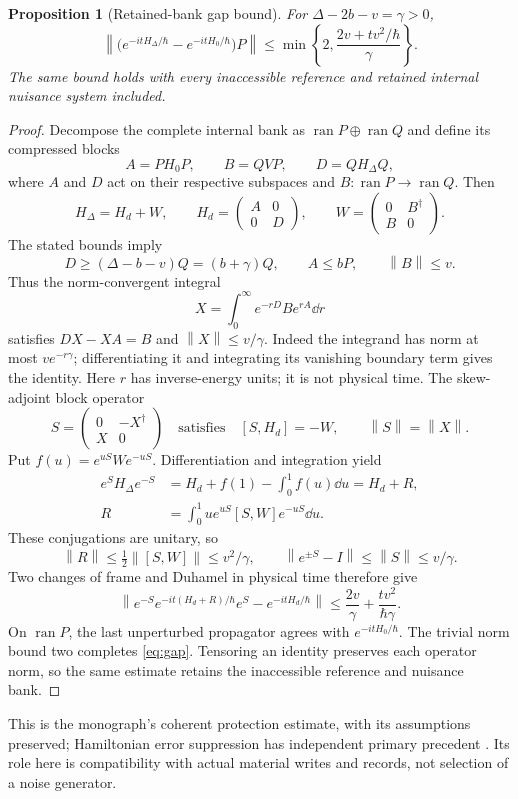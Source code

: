 \documentclass[11pt]{article}
\newtheorem{proposition}[theorem]{Proposition}
\theoremstyle{definition}\newtheorem{assumption}[theorem]{Constitutive assumption}
\theoremstyle{remark}\newtheorem{remark}[theorem]{Remark}
\newcommand{\norm}[1]{\left\|#1\right\|}\newcommand{\pos}[1]{[#1]_+}
\begin{document}
\begin{proposition}[Retained-bank gap bound]\label{prop:gap}
For $\Delta-2b-v=\gamma>0$,
\begin{equation}\label{eq:gap}
 \norm{\bigl(e^{-itH_\Delta/\hbar}-e^{-itH_0/\hbar}\bigr)P}
 \le\min\left\{2,\frac{2v+tv^2/\hbar}{\gamma}\right\}.
\end{equation}
The same bound holds with every inaccessible reference and retained internal nuisance system included.
\end{proposition}
\begin{proof}
Decompose the complete internal bank as
$\operatorname{ran}P\oplus\operatorname{ran}Q$ and define its
compressed blocks
\[
 A=PH_0P,\qquad B=QVP,\qquad D=QH_\Delta Q,
\]
where $A$ and $D$ act on their respective subspaces and
$B:\operatorname{ran}P\to\operatorname{ran}Q$. Then
\[
 H_\Delta=H_d+W,\qquad
 H_d=\begin{pmatrix}A&0\\0&D\end{pmatrix},\qquad
 W=\begin{pmatrix}0&B^\dagger\\B&0\end{pmatrix}.
\]
The stated bounds imply
\[
 D\ge(\Delta-b-v)Q=(b+\gamma)Q,
 \qquad A\le bP,\qquad \norm B\le v.
\]
Thus the norm-convergent integral
\[
 X=\int_0^\infty e^{-rD}Be^{rA}\dd r
\]
satisfies $DX-XA=B$ and $\norm X\le v/\gamma$.
Indeed the integrand has norm at most $v e^{-r\gamma}$;
differentiating it and integrating its vanishing boundary term gives
the identity. Here $r$ has inverse-energy units; it is not physical
time. The skew-adjoint block operator
\[
 S=\begin{pmatrix}0&-X^\dagger\\X&0\end{pmatrix}
 \quad\text{satisfies}\quad
 [S,H_d]=-W,\qquad \norm S=\norm X.
\]
Put $f(u)=e^{uS}We^{-uS}$. Differentiation and integration yield
\begin{align*}
 e^SH_\Delta e^{-S}
 &=H_d+f(1)-\int_0^1f(u)\dd u=H_d+R,\\
 R&=\int_0^1u e^{uS}[S,W]e^{-uS}\dd u.
\end{align*}
These conjugations are unitary, so
\[
 \norm R\le\tfrac12\norm{[S,W]}\le v^2/\gamma,
 \qquad \norm{e^{\pm S}-I}\le\norm S\le v/\gamma.
\]
Two changes of frame and Duhamel in physical time therefore give
\[
 \norm{e^{-S}e^{-it(H_d+R)/\hbar}e^S-e^{-itH_d/\hbar}}
 \le\frac{2v}{\gamma}+\frac{tv^2}{\hbar\gamma}.
\]
On $\operatorname{ran}P$, the last unperturbed propagator agrees
with $e^{-itH_0/\hbar}$. The trivial norm bound two completes
\eqref{eq:gap}. Tensoring an identity preserves each operator norm,
so the same estimate retains the inaccessible reference and nuisance
bank.
\end{proof}
This is the monograph's coherent protection estimate, with its assumptions preserved; Hamiltonian error suppression has independent primary precedent \cite{MarvianLidar}. Its role here is compatibility with actual material writes and records, not selection of a noise generator.
\end{document}
